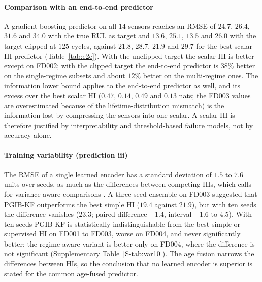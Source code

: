 \documentclass[preprint,12pt]{elsarticle}
\theoremstyle{definition}
\begin{document}
\begin{table}[!t]
\caption{Unused life [cycles] at fixed failure risk on the official test engines (replacement scheduled at the predicted RUL plus a cross-fitted margin that makes $5\%$ or $10\%$ of the engines fail).}
\label{tab:decision}
\centering\scriptsize
{}
\end{table}

\paragraph{Comparison with an end-to-end predictor} A gradient-boosting predictor on all $14$ sensors reaches an RMSE of $24.7$, $26.4$, $31.6$ and $34.0$ with the true RUL as target and $13.6$, $25.1$, $13.5$ and $26.0$ with the target clipped at $125$ cycles, against $21.8$, $28.7$, $21.9$ and $29.7$ for the best scalar-HI predictor (Table~\ref{tab:e2e}). With the unclipped target the scalar HI is better except on FD002; with the clipped target the end-to-end predictor is $38\%$ better on the single-regime subsets and about $12\%$ better on the multi-regime ones. The information lower bound applies to the end-to-end predictor as well, and its excess over the best scalar HI ($0.47$, $0.14$, $0.49$ and $0.13$ nats; the FD003 values are overestimated because of the lifetime-distribution mismatch) is the information lost by compressing the sensors into one scalar. A scalar HI is therefore justified by interpretability and threshold-based failure models, not by accuracy alone.

\begin{table}[!t]
\caption{Scalar-HI predictors and an end-to-end predictor on all sensors, official C-MAPSS test engines.}
\label{tab:e2e}
\centering\scriptsize
{}
\end{table}

\paragraph{Training variability (prediction iii)} The RMSE of a single learned encoder has a standard deviation of $1.5$ to $7.6$ units over seeds, as much as the differences between competing HIs, which calls for variance-aware comparisons \cite{bouthillier2021}. A three-seed ensemble on FD003 suggested that PGIB-KF outperforms the best simple HI ($19.4$ against $21.9$), but with ten seeds \cite{lakshminarayanan2017} the difference vanishes ($23.3$; paired difference $+1.4$, interval $-1.6$ to $4.5$). With ten seeds PGIB-KF is statistically indistinguishable from the best simple or supervised HI on FD001 to FD003, worse on FD004, and never significantly better; the regime-aware variant is better only on FD004, where the difference is not significant (Supplementary Table~\ref{S-tab:var10}). The age fusion narrows the differences between HIs, so the conclusion that no learned encoder is superior is stated for the common age-fused predictor.
\end{document}
